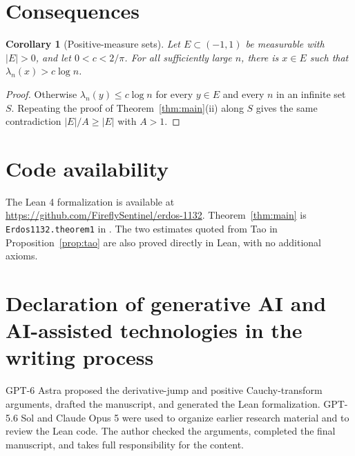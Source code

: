 \documentclass[11pt]{article}
\newtheorem{corollary}[theorem]{Corollary}
\theoremstyle{remark}
\numberwithin{equation}{section}
\begin{document}
\section{Consequences}
\label{sec:consequences}

\begin{corollary}[Positive-measure sets]\label{cor:positive-measure}
Let \(E\subset(-1,1)\) be measurable with \(|E|>0\), and let
\(0<c<2/\pi\). For all sufficiently large \(n\), there is \(x\in E\)
such that \(\lambda_n(x)>c\log n\).
\end{corollary}
\begin{proof}
Otherwise \(\lambda_n(y)\le c\log n\) for every \(y\in E\) and every
\(n\) in an infinite set \(S\). Repeating the proof of
Theorem~\ref{thm:main}(ii) along \(S\) gives the same contradiction
\(|E|/A\ge|E|\) with \(A>1\).
\end{proof}

\section*{Code availability}

The Lean 4 formalization is available at
\url{https://github.com/FireflySentinel/erdos-1132}.
Theorem~\ref{thm:main} is \texttt{Erdos1132.theorem1} in
.
The two estimates quoted from Tao in Proposition~\ref{prop:tao} are
also proved directly in Lean, with no additional axioms.

\section*{Declaration of generative AI and AI-assisted technologies in the writing process}

GPT-6 Astra proposed the derivative-jump and positive Cauchy-transform
arguments, drafted the manuscript,
and generated the Lean formalization.
GPT-5.6 Sol and Claude Opus 5 were used to organize earlier research material
and to review the Lean code.
The author checked the arguments, completed the final manuscript, and takes
full responsibility for the content.
\end{document}
